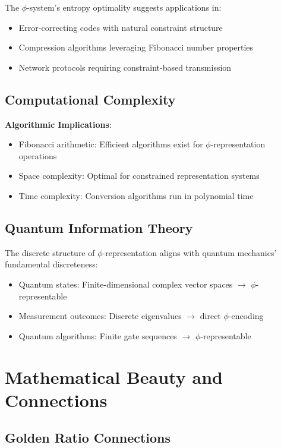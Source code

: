 \documentclass[12pt,letterpaper]{article}
\begin{document}
The $\phi$-system's entropy optimality suggests applications in:
\begin{itemize}
\item Error-correcting codes with natural constraint structure
\item Compression algorithms leveraging Fibonacci number properties
\item Network protocols requiring constraint-based transmission
\end{itemize}

\subsection{Computational Complexity}

\textbf{Algorithmic Implications}:
\begin{itemize}
\item Fibonacci arithmetic: Efficient algorithms exist for $\phi$-representation operations
\item Space complexity: Optimal for constrained representation systems
\item Time complexity: Conversion algorithms run in polynomial time
\end{itemize}

\subsection{Quantum Information Theory}

The discrete structure of $\phi$-representation aligns with quantum mechanics' fundamental discreteness:
\begin{itemize}
\item Quantum states: Finite-dimensional complex vector spaces $\to$ $\phi$-representable
\item Measurement outcomes: Discrete eigenvalues $\to$ direct $\phi$-encoding
\item Quantum algorithms: Finite gate sequences $\to$ $\phi$-representable
\end{itemize}

\section{Mathematical Beauty and Connections}

\subsection{Golden Ratio Connections}
\end{document}
